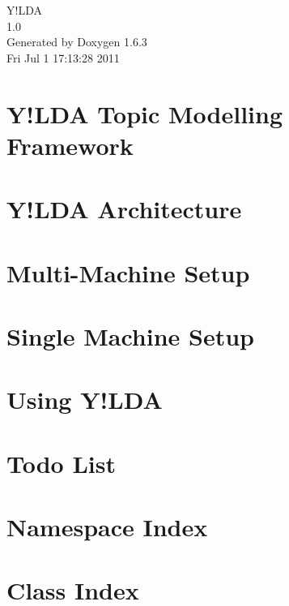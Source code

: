 \documentclass[letterpaper]{book}
\begin{document}
\hypersetup{pageanchor=false}
\begin{titlepage}
\vspace*{7cm}
\begin{center}
{\Large Y!LDA \\[1ex]\large 1.0 }\\
\vspace*{1cm}
{\large Generated by Doxygen 1.6.3}\\
\vspace*{0.5cm}
{\small Fri Jul 1 17:13:28 2011}\\
\end{center}
\end{titlepage}
\clearemptydoublepage
{}
\tableofcontents
\clearemptydoublepage
{}
\hypersetup{pageanchor=true}
\chapter{Y!LDA Topic Modelling Framework}
\label{index}\hypertarget{index}{}
\chapter{Y!LDA Architecture}
\label{architecture}
\hypertarget{architecture}{}

\chapter{Multi-\/Machine Setup}
\label{multi_machine_usage}
\hypertarget{multi_machine_usage}{}

\chapter{Single Machine Setup}
\label{single_machine_usage}
\hypertarget{single_machine_usage}{}

\chapter{Using Y!LDA}
\label{usage}
\hypertarget{usage}{}

\chapter{Todo List}
\label{todo}
\hypertarget{todo}{}

\chapter{Namespace Index}

\chapter{Class Index}

\end{document}
